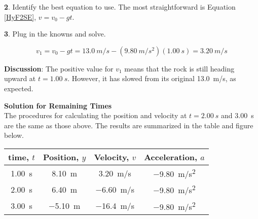 \documentclass[main-ap-physics.tex]{subfiles}
\begin{document}
\textbf{2}. Identify the best equation to use. The most straightforward is Equation \eqref{HyF2SE}, $v = v_0 - gt$.

\vspace{1em}

\textbf{3}. Plug in the knowns and solve.

\begin{equation*}
    v_1 = v_0 - gt = \SI{13.0}{m/s} - \left(\SI{9.80}{m/s^2}\right) \left(\SI{1.00}{s}\right) = \SI{3.20}{m/s}
\end{equation*}

\textbf{Discussion}: The positive value for $v_1$ means that the rock is still heading upward at $t = \SI{1.00}{s}$. However, it has slowed from its original \SI{13.0}{m/s}, as expected.

\vspace{1em}

\textbf{Solution for Remaining Times}\\
The procedures for calculating the position and velocity at $t = \SI{2.00}{s}$ and \SI{3.00}{s} are the same as those above. The results are summarized in the table and figure below.

\begin{center}
    \begin{tabular}{c|c|c|c}
        \textbf{time, $t$} & \textbf{Position, $y$} & \textbf{Velocity, $v$} & \textbf{Acceleration, $a$} \\ \hline
        \SI{1.00}{s} & \SI{8.10}{m} & \SI{3.20}{m/s} & \SI{-9.80}{m/s^2}\\ 
        \SI{2.00}{s} & \SI{6.40}{m} & \SI{-6.60}{m/s} & \SI{-9.80}{m/s^2}\\
        \SI{3.00}{s} & \SI{-5.10}{m} & \SI{-16.4}{m/s} & \SI{-9.80}{m/s^2}\\ \hline
    \end{tabular}
\end{center}
\end{document}
